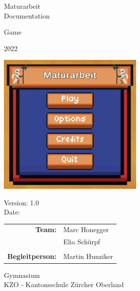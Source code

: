 \begin{titlepage}

    \begin{center}

        \vspace{1 cm}

        {\Large Maturarbeit \\ Documentation} \\

        \vspace{0.5cm}

        {\Huge Game}

        \vspace{0.5cm}

        2022 

        \vspace{1 cm}

        \includegraphics[height=7cm]{resources/DummyLogo.png}

        \vspace{1 cm}

        Version: 1.0 \\
        Date: \DTMnow \\
        \vspace{1 cm}

        \begin{tabular}{rl}
            \textbf{Team:}          & Marc Honegger \\
                                    & Elia Schürpf \\
                                    \\
            \textbf{Begleitperson:} & Martin Hunziker
        \end{tabular}

        \vfill

        \vspace{1cm}
        Gymnasium \\
        KZO - Kantonsschule Zürcher Oberland

    \end{center}

\end{titlepage}
